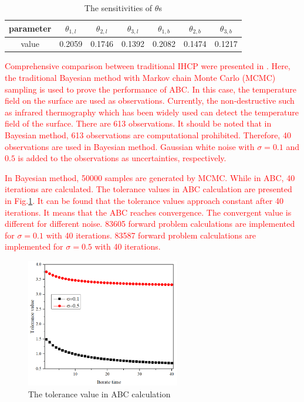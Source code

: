 \documentclass[review]{elsarticle}
\begin{document}
\begin{table}[]
    \centering
    \caption{The sensitivities of $\theta$s}
    \begin{tabular}{c c c c c c c}
        \hline
         parameter & $\theta_{1,l}$ & $\theta_{2,l}$ & $\theta_{3,l}$ &$\theta_{1,b}$ & $\theta_{2,b}$ & $\theta_{3,b}$ \\
         \hline
         value & 0.2059 & 0.1746 & 0.1392 & 0.2082 & 0.1474 & 0.1217\\
        
         \hline
    \end{tabular}
    \label{tab:sensi_case1}
\end{table}

\textcolor{red}{Comprehensive comparison between traditional IHCP were presented in \cite{mocerino2018filtered, wang2004bayesian}. Here, the traditional Bayesian method with Markov chain Monte Carlo (MCMC) sampling is used to prove the performance of ABC. In this case, the temperature field on the surface are used as observations. Currently, the non-destructive such as infrared thermography which has been widely used can detect the temperature field of the surface. There are 613 observations. It should be noted that in Bayesian method, 613 observations are computational prohibited. Therefore, 40 observations are used in Bayesian method. Gaussian white noise with $\sigma=0.1$ and $0.5$ is added to the observations as uncertainties\cite{doltsinis2001ordinary}, respectively. }

\textcolor{red}{In Bayesian method, 50000 samples are generated by MCMC. While in ABC, 40 iterations are calculated. The tolerance values in ABC calculation are presented in Fig.\ref{fig:convergence}. It can be found that the tolerance values approach constant after 40 iterations. It means that the ABC reaches convergence. The convergent value is different for different noise. 83605 forward problem calculations are implemented for $\sigma=0.1$ with 40 iterations. 83587 forward problem calculations are implemented for $\sigma=0.5$ with 40 iterations.} 

\begin{figure}
    \centering
    \includegraphics[width=0.6\textwidth]{fig/convergence.png}
    \caption{The tolerance value in ABC calculation}
    \label{fig:convergence}
\end{figure}
\end{document}
